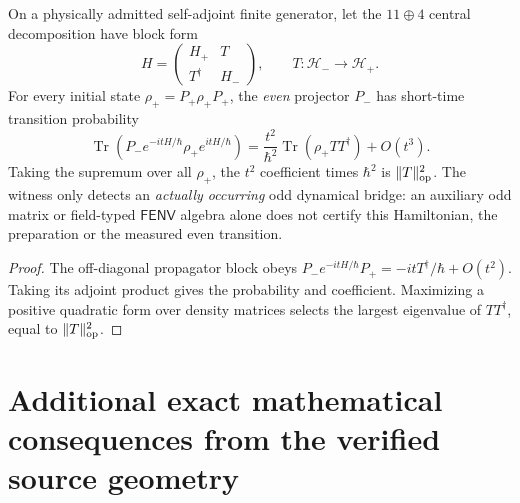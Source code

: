 \documentclass[12pt,a4paper]{article}
\begin{document}
\begin{proposition}
\label{p4b:prop:v347-odd-transfer-witness}
On a physically admitted self-adjoint finite generator, let the
\(11\oplus4\) central decomposition have block form
\[
 H=\begin{pmatrix}H_+&T\\T^\dagger&H_-\end{pmatrix},
 \qquad T:\mathcal H_-\longrightarrow\mathcal H_+.
\]
For every initial state \(\rho_+=P_+\rho_+P_+\), the \emph{even}
projector \(P_-\) has short-time transition probability
\begin{equation}\label{p4b:eq:v347-odd-transfer}
 \boxed{\operatorname{Tr}(P_-e^{-itH/\hbar}\rho_+e^{itH/\hbar})
 =\frac{t^2}{\hbar^2}\operatorname{Tr}(\rho_+TT^\dagger)
 +O(t^3).}
\end{equation}
Taking the supremum over all \(\rho_+\), the \(t^2\) coefficient times
\(\hbar^2\) is \(\|T\|_{\rm op}^2\).  The witness only detects an
\emph{actually occurring} odd dynamical bridge: an auxiliary odd matrix
or field-typed \(\mathsf{FENV}\) algebra alone does not certify this
Hamiltonian, the preparation or the measured even transition.
\end{proposition}
\begin{proof}
The off-diagonal propagator block obeys
\(P_-e^{-itH/\hbar}P_+=-itT^\dagger/\hbar+O(t^2)\).
Taking its adjoint product gives the probability and coefficient.
Maximizing a positive quadratic form over density matrices selects the
largest eigenvalue of \(TT^\dagger\), equal to \(\|T\|_{\rm op}^2\).
\end{proof}



\section{Additional exact mathematical consequences from the verified source geometry}

\end{document}
